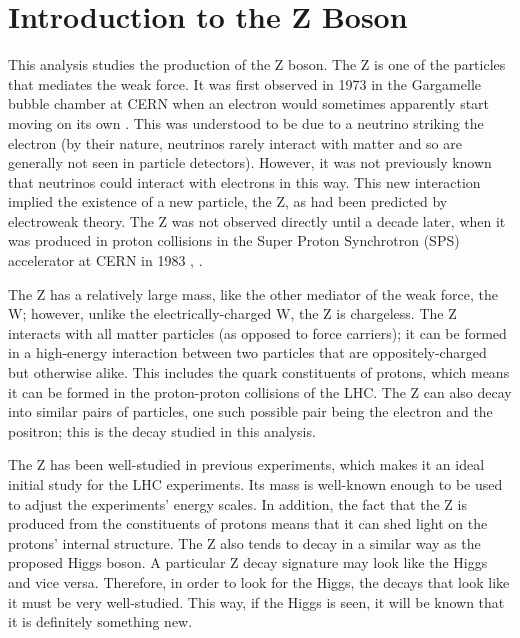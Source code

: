 


\section{Introduction to the Z Boson}
This analysis studies the production of the Z boson.  
The Z is one of the particles that mediates the weak force.  
It was first observed in 1973 in the Gargamelle bubble chamber at CERN 
when an electron would sometimes apparently start moving on its own 
\cite{NC-Gargamelle}.  
This was understood to be due to a neutrino striking the electron 
(by their nature, neutrinos rarely interact with matter and so are generally 
not seen in particle detectors).  
However, it was not previously known that neutrinos could interact 
with electrons in this way.  
This new interaction implied the existence of a new particle, the Z, 
as had been predicted by electroweak theory.  
The Z was not observed directly until a decade later, 
when it was produced in proton collisions in the 
Super Proton Synchrotron (SPS) accelerator at CERN in 1983 
\cite{Z-ua1}, \cite{Z-ua2}.  

The Z has a relatively large mass, 
like the other mediator of the weak force, the W; 
however, unlike the electrically-charged W, the Z is chargeless.  
The Z interacts with all matter particles (as opposed to force carriers); 
it can be formed in a high-energy interaction between 
two particles that are oppositely-charged but otherwise alike.  
This includes the quark constituents of protons, 
which means it can be formed in the proton-proton collisions 
of the LHC.  
The Z can also decay into similar pairs of particles, 
one such possible pair being the electron and the positron; 
this is the decay studied in this analysis.  

The Z has been well-studied in previous experiments, 
which makes it an ideal initial study for the LHC experiments.  
Its mass is well-known enough to be used to 
adjust the experiments' energy scales.  
In addition, the fact that the Z is produced from the 
constituents of protons 
means that it can shed light on the protons' internal structure.   
The Z also tends to decay in a similar way as the 
proposed Higgs boson. %
A particular Z decay signature may 
look like the Higgs and vice versa.  
Therefore, in order to look for the Higgs, 
the decays that look like it must be very well-studied.  
This way, if the Higgs is seen, 
it will be known that it is definitely something new.  



